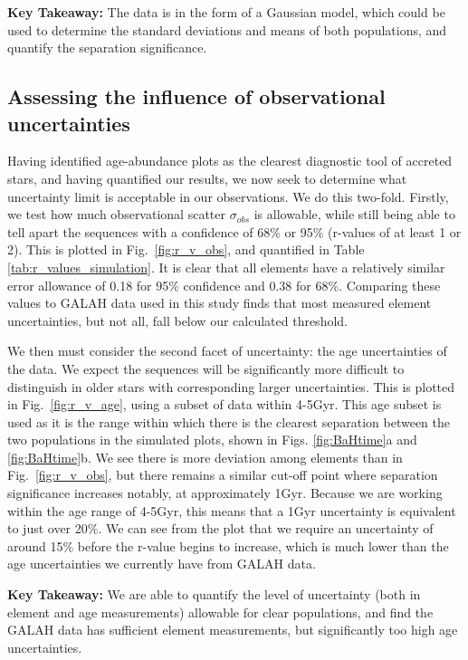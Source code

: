 \documentclass[fleqn,usenatbib]{mnras}
\newcommand{\SB}[1]{{\textcolor{orange}{SB: #1}}}
\begin{document}
\textbf{Key Takeaway:} The data is in the form of a Gaussian model, which could be used to determine the standard deviations and means of both populations, and quantify the separation significance. 




\subsection{Assessing the influence of observational uncertainties}

Having identified age-abundance plots as the clearest diagnostic tool of accreted stars, and having quantified our results, we now seek to determine what uncertainty limit is acceptable in our observations. We do this two-fold. Firstly, we test how much observational scatter $\sigma_{obs}$ is allowable, while still being able to tell apart the sequences with a confidence of 68\% or 95\% (r-values of at least 1 or 2). This is plotted in Fig.~\ref{fig:r_v_obs}, and quantified in Table \ref{tab:r_values_simulation}. It is clear that all elements have a relatively similar error allowance of 0.18 for 95\% confidence and 0.38 for 68\%. Comparing these values to GALAH data used in this study finds that most measured element uncertainties, but not all, fall below our calculated threshold. \par  
We then must consider the second facet of uncertainty: the age uncertainties of the data. We expect the sequences will be significantly more difficult to distinguish in older stars with corresponding larger uncertainties. This is plotted in Fig.~\ref{fig:r_v_age}, using a subset of data within 4-5Gyr. This age subset is used as it is the range within which there is the clearest separation between the two populations in the simulated plots, shown in Figs. \ref{fig:BaHtime}a and \ref{fig:BaHtime}b. We see there is more deviation among elements than in Fig.~\ref{fig:r_v_obs}, but there remains a similar cut-off point where separation significance increases notably, at approximately 1Gyr. Because we are working within the age range of 4-5Gyr, this means that a 1Gyr uncertainty is equivalent to just over 20\%. We can see from the plot that we require an uncertainty of around 15\% before the r-value begins to increase, which is much lower than the age uncertainties we currently have from GALAH data. \par
\textbf{Key Takeaway:} We are able to quantify the level of uncertainty (both in element and age measurements) allowable for clear populations, and find the GALAH data has sufficient element measurements, but significantly too high age uncertainties. 
\end{document}
